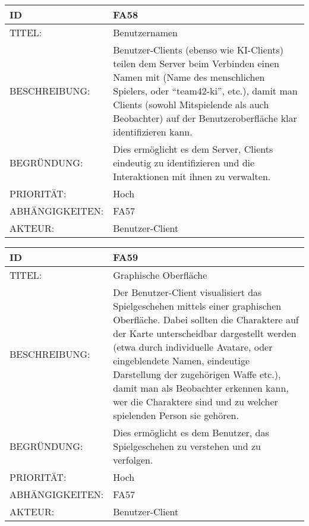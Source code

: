 \documentclass{uulm-assignment}
\begin{document}
     \begin{tabularx}{\textwidth}{|l|X |} \hline
        \textbf{ID} & \textbf{FA58} \\
        \hline
        TITEL: & Benutzernamen\\
        \hline
        BESCHREIBUNG: &  Benutzer-Clients (ebenso wie KI-Clients) teilen dem Server beim Verbinden einen Namen mit (Name des menschlichen Spielers, oder “team42-ki”, etc.), damit man Clients (sowohl Mitspielende als auch Beobachter) auf der Benutzeroberfläche klar identifizieren kann.
        \\
        \hline
        BEGRÜNDUNG: & Dies ermöglicht es dem Server, Clients eindeutig zu identifizieren und die Interaktionen mit ihnen zu verwalten. \\
        \hline
        PRIORITÄT: & Hoch \\
        \hline
        ABHÄNGIGKEITEN: & FA57 \\
        \hline
        AKTEUR: & Benutzer-Client\\
        \hline
    \end{tabularx}
    
     \begin{tabularx}{\textwidth}{|l|X |} \hline
        \textbf{ID} & \textbf{FA59} \\
        \hline
        TITEL: & Graphische Oberfläche\\
        \hline
        BESCHREIBUNG: & Der Benutzer-Client visualisiert das Spielgeschehen mittels einer graphischen Oberfläche. Dabei sollten die Charaktere auf der Karte unterscheidbar dargestellt werden (etwa durch individuelle Avatare, oder eingeblendete Namen, eindeutige Darstellung der zugehörigen Waffe etc.), damit man als Beobachter erkennen kann, wer die Charaktere sind und zu welcher spielenden Person sie gehören.
        \\
        \hline
        BEGRÜNDUNG: &  Dies ermöglicht es dem Benutzer, das Spielgeschehen zu verstehen und zu verfolgen. \\
        \hline
        PRIORITÄT: & Hoch\\
        \hline
        ABHÄNGIGKEITEN: & FA57 \\
        \hline
        AKTEUR: & Benutzer-Client\\
        \hline
    \end{tabularx}
    
\end{document}
